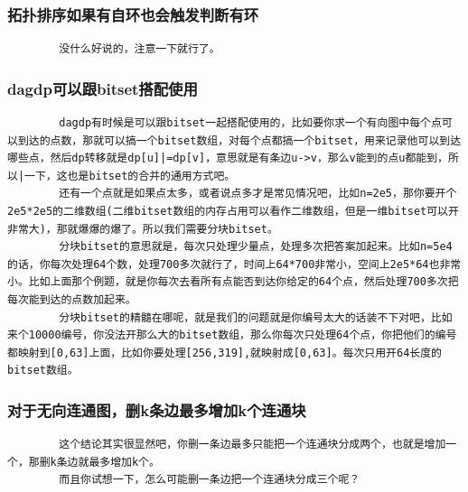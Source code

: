 \documentclass[10pt, a4paper, twocolumn]{article} %
\begin{document}
    \subsubsection{拓扑排序如果有自环也会触发判断有环}
    \begin{lstlisting}
        没什么好说的，注意一下就行了。
    \end{lstlisting}
    \subsubsection{dagdp可以跟bitset搭配使用}
    \begin{lstlisting}
        dagdp有时候是可以跟bitset一起搭配使用的，比如要你求一个有向图中每个点可以到达的点数，那就可以搞一个bitset数组，对每个点都搞一个bitset，用来记录他可以到达哪些点，然后dp转移就是dp[u]|=dp[v]，意思就是有条边u->v，那么v能到的点u都能到，所以|一下，这也是bitset的合并的通用方式吧。
        还有一个点就是如果点太多，或者说点多才是常见情况吧，比如n=2e5，那你要开个2e5*2e5的二维数组(二维bitset数组的内存占用可以看作二维数组，但是一维bitset可以开非常大)，那就爆爆的爆了。所以我们需要分块bitset。
        分块bitset的意思就是，每次只处理少量点，处理多次把答案加起来。比如n=5e4的话，你每次处理64个数，处理700多次就行了，时间上64*700非常小，空间上2e5*64也非常小。比如上面那个例题，就是你每次去看所有点能否到达你给定的64个点，然后处理700多次把每次能到达的点数加起来。
        分块bitset的精髓在哪呢，就是我们的问题就是你编号太大的话装不下对吧，比如来个10000编号，你没法开那么大的bitset数组，那么你每次只处理64个点，你把他们的编号都映射到[0,63]上面，比如你要处理[256,319],就映射成[0,63]。每次只用开64长度的bitset数组。
    \end{lstlisting}
    \subsubsection{对于无向连通图，删k条边最多增加k个连通块}
    \begin{lstlisting}
        这个结论其实很显然吧，你删一条边最多只能把一个连通块分成两个，也就是增加一个，那删k条边就最多增加k个。
        而且你试想一下，怎么可能删一条边把一个连通块分成三个呢？
    \end{lstlisting}
\end{document}
